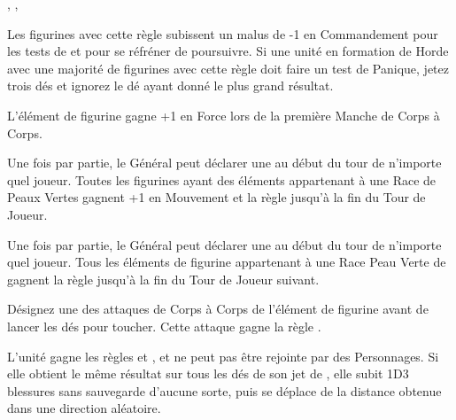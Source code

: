 \begin{multicols}{3}
\begin{center}
\vspace*{5pt}\strider{\forest}, \unruly{}, \insignificant{}
\end{center}

\end{multicols}

\vspace*{-10pt}\armyspecialruleentry{\unruly}

Les figurines avec cette règle subissent un malus de -1 en Commandement pour les tests de \frenzy{} et pour se réfréner de poursuivre. Si une unité en formation de Horde avec une majorité de figurines avec cette règle doit faire un test de Panique, jetez trois dés et ignorez le dé ayant donné le plus grand résultat.

\armyspecialruleentry{\borntofight}

L'élément de figurine gagne +1 en Force lors de la première Manche de Corps à Corps.


\begin{multicols}{2}\raggedcolumns
\setlength{\columnseprule}{1pt}
\renewcommand{\columnseprulecolor}{\color{black!30}}
\armyspecialruleentry{\waaargh}

Une fois par partie, le Général peut déclarer une \waaargh{} au début du tour de n'importe quel joueur. Toutes les figurines ayant des éléments appartenant à une Race de Peaux Vertes gagnent +1 en Mouvement et la règle \swiftstride{} jusqu'à la fin du Tour de Joueur.

\columnbreak
\armyspecialruleentry{\greentide}

Une fois par partie, le Général peut déclarer une \greentide{} au début du tour de n'importe quel joueur. Tous les éléments de figurine appartenant à une Race Peau Verte de \goblins{} gagnent la règle \fightinextrarank{} jusqu'à la fin du Tour de Joueur suivant.

\end{multicols}

\armyspecialruleentry{\venomousfangs}

Désignez une des attaques de Corps à Corps de l'élément de figurine avant de lancer les dés pour toucher. Cette attaque gagne la règle \multiplewounds{\ordnance}{}.


L'unité gagne les règles  et \immunetopsychology{}, et ne peut pas être rejointe par des Personnages. Si elle obtient le même résultat sur tous les dés de son jet de \randommovement{}, elle subit 1D3 blessures sans sauvegarde d'aucune sorte, puis se déplace de la distance obtenue dans une direction aléatoire.

